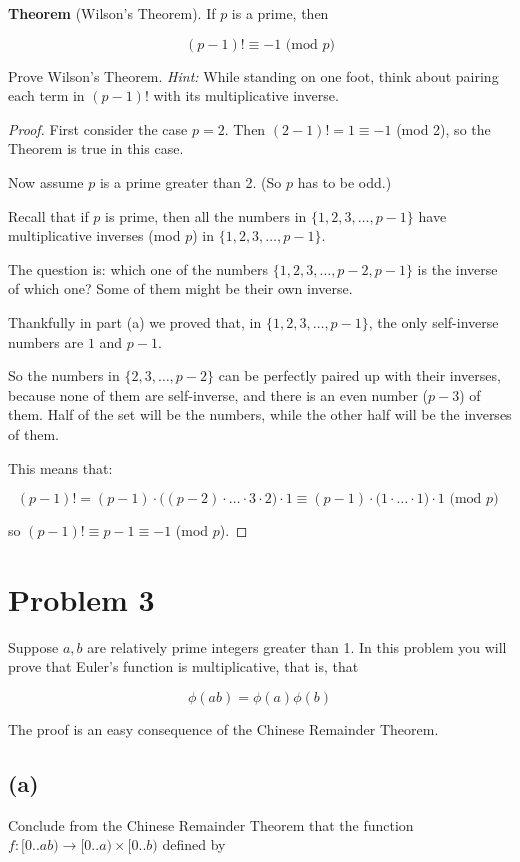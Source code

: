 \documentclass[14pt]{extarticle}
\begin{document}
\textbf{Theorem} (Wilson’s Theorem). If $p$ is a prime, then 

$$
(p - 1)! \equiv -1 \text{ (mod $p$)}
$$

Prove Wilson’s Theorem. \textit{Hint:} While standing on one foot, think about pairing each term in $(p - 1)!$ with its multiplicative inverse.

\begin{proof}
First consider the case $p = 2$. Then $(2-1)! = 1 \equiv -1$ (mod 2), so the Theorem is true in this case.

Now assume $p$ is a prime greater than 2. (So $p$ has to be odd.)

Recall that if $p$ is prime, then all the numbers in $\{1, 2, 3, \ldots, p-1\}$ have multiplicative inverses (mod $p$) in $\{1, 2, 3, \ldots, p-1\}$.

The question is: which one of the numbers $\{1, 2, 3, \ldots, p-2, p-1 \}$ is the inverse of which one? Some of them might be their own inverse.

Thankfully in part (a) we proved that, in $\{1, 2, 3, \ldots, p-1\}$, the only self-inverse numbers are $1$ and $p-1$. 

So the numbers in $\{2, 3, \ldots, p-2\}$ can be perfectly paired up with their inverses, because none of them are self-inverse, and there is an even number ($p-3$) of them. Half of the set will be the numbers, while the other half will be the inverses of them.

This means that:

$$
(p-1)! = (p-1)\cdot \Big((p-2)\cdot\ldots\cdot 3 \cdot 2 \Big) \cdot 1 \equiv (p-1)\cdot \Big(1 \cdot \ldots \cdot 1\Big) \cdot 1 \text{ (mod $p$) }
$$

so $(p-1)! \equiv p - 1 \equiv -1$ (mod $p$).
\end{proof}

\section{Problem 3}
Suppose $a, b$ are relatively prime integers greater than 1. In this problem you will prove that Euler’s function is multiplicative, that is, that

$$
\phi(ab) = \phi(a)\phi(b)
$$

The proof is an easy consequence of the Chinese Remainder Theorem.

\subsection{(a)}
Conclude from the Chinese Remainder Theorem that the function $f: [0..ab) \to [0..a) \times [0..b)$ defined by
\end{document}
